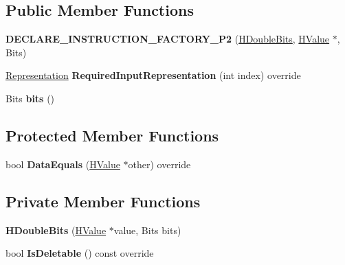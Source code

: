 \subsection*{Public Member Functions}
\begin{DoxyCompactItemize}
\item 
{\bfseries D\+E\+C\+L\+A\+R\+E\+\_\+\+I\+N\+S\+T\+R\+U\+C\+T\+I\+O\+N\+\_\+\+F\+A\+C\+T\+O\+R\+Y\+\_\+\+P2} (\hyperlink{classv8_1_1internal_1_1_h_double_bits}{H\+Double\+Bits}, \hyperlink{classv8_1_1internal_1_1_h_value}{H\+Value} $\ast$, Bits)\hypertarget{classv8_1_1internal_1_1_h_double_bits_a97a34aa048b8c027e05482f409a52f1c}{}\label{classv8_1_1internal_1_1_h_double_bits_a97a34aa048b8c027e05482f409a52f1c}

\item 
\hyperlink{classv8_1_1internal_1_1_representation}{Representation} {\bfseries Required\+Input\+Representation} (int index) override\hypertarget{classv8_1_1internal_1_1_h_double_bits_a8fc509dad16ef7e29c2974b705b12261}{}\label{classv8_1_1internal_1_1_h_double_bits_a8fc509dad16ef7e29c2974b705b12261}

\item 
Bits {\bfseries bits} ()\hypertarget{classv8_1_1internal_1_1_h_double_bits_a9673779db149fd2b7d16dc72fdb41f5a}{}\label{classv8_1_1internal_1_1_h_double_bits_a9673779db149fd2b7d16dc72fdb41f5a}

\end{DoxyCompactItemize}
\subsection*{Protected Member Functions}
\begin{DoxyCompactItemize}
\item 
bool {\bfseries Data\+Equals} (\hyperlink{classv8_1_1internal_1_1_h_value}{H\+Value} $\ast$other) override\hypertarget{classv8_1_1internal_1_1_h_double_bits_a93cffaa940c9c3c3bf636676e94a147f}{}\label{classv8_1_1internal_1_1_h_double_bits_a93cffaa940c9c3c3bf636676e94a147f}

\end{DoxyCompactItemize}
\subsection*{Private Member Functions}
\begin{DoxyCompactItemize}
\item 
{\bfseries H\+Double\+Bits} (\hyperlink{classv8_1_1internal_1_1_h_value}{H\+Value} $\ast$value, Bits bits)\hypertarget{classv8_1_1internal_1_1_h_double_bits_a437ef0c7ed31795140315aafe95c0ffc}{}\label{classv8_1_1internal_1_1_h_double_bits_a437ef0c7ed31795140315aafe95c0ffc}

\item 
bool {\bfseries Is\+Deletable} () const  override\hypertarget{classv8_1_1internal_1_1_h_double_bits_a143a3f8a21dc736cb260ec08da042d05}{}\label{classv8_1_1internal_1_1_h_double_bits_a143a3f8a21dc736cb260ec08da042d05}

\end{DoxyCompactItemize}
